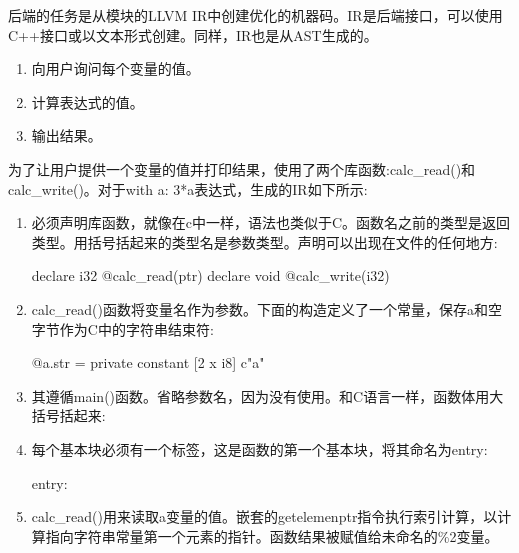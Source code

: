 
后端的任务是从模块的LLVM IR中创建优化的机器码。IR是后端接口，可以使用C++接口或以文本形式创建。同样，IR也是从AST生成的。


\begin{enumerate}
\item
向用户询问每个变量的值。

\item
计算表达式的值。

\item
输出结果。
\end{enumerate}

为了让用户提供一个变量的值并打印结果，使用了两个库函数:calc\_read()和calc\_write()。对于with a: 3*a表达式，生成的IR如下所示:

\begin{enumerate}
\item
必须声明库函数，就像在c中一样，语法也类似于C。函数名之前的类型是返回类型。用括号括起来的类型名是参数类型。声明可以出现在文件的任何地方:

\begin{shell}
declare i32 @calc_read(ptr)
declare void @calc_write(i32)
\end{shell}

\item
calc\_read()函数将变量名作为参数。下面的构造定义了一个常量，保存a和空字节作为C中的字符串结束符:

\begin{shell}
@a.str = private constant [2 x i8] c"a"
\end{shell}

\item
其遵循main()函数。省略参数名，因为没有使用。和C语言一样，函数体用大括号括起来:

\begin{shell}
define i32 @main(i32, ptr) {
\end{shell}

\item
每个基本块必须有一个标签，这是函数的第一个基本块，将其命名为entry:

\begin{shell}
entry:
\end{shell}

\item
calc\_read()用来读取a变量的值。嵌套的getelemenptr指令执行索引计算，以计算指向字符串常量第一个元素的指针。函数结果被赋值给未命名的\%2变量。

\begin{shell}
\end{shell}


\end{enumerate}
